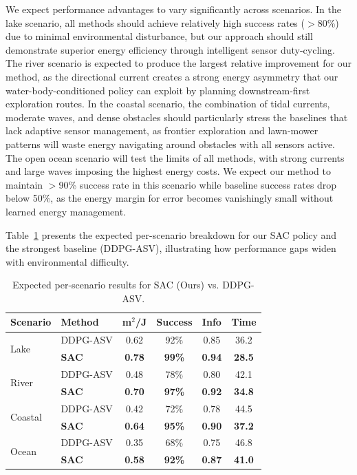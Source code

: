 \documentclass[conference]{IEEEtran}
\begin{document}
We expect performance advantages to vary significantly across scenarios. In the lake scenario, all methods should achieve relatively high success rates ($>$80\%) due to minimal environmental disturbance, but our approach should still demonstrate superior energy efficiency through intelligent sensor duty-cycling. The river scenario is expected to produce the largest relative improvement for our method, as the directional current creates a strong energy asymmetry that our water-body-conditioned policy can exploit by planning downstream-first exploration routes. In the coastal scenario, the combination of tidal currents, moderate waves, and dense obstacles should particularly stress the baselines that lack adaptive sensor management, as frontier exploration and lawn-mower patterns will waste energy navigating around obstacles with all sensors active. The open ocean scenario will test the limits of all methods, with strong currents and large waves imposing the highest energy costs. We expect our method to maintain $>$90\% success rate in this scenario while baseline success rates drop below 50\%, as the energy margin for error becomes vanishingly small without learned energy management.

Table~\ref{tab:per_scenario} presents the expected per-scenario breakdown for our SAC policy and the strongest baseline (DDPG-ASV), illustrating how performance gaps widen with environmental difficulty.

\begin{table}[t]
\centering
\caption{Expected per-scenario results for SAC (Ours) vs. DDPG-ASV.}
\label{tab:per_scenario}
\scriptsize
\begin{tabular}{llcccc}
\toprule
\textbf{Scenario} & \textbf{Method} & \textbf{m$^2$/J} & \textbf{Success} & \textbf{Info} & \textbf{Time} \\
\midrule
\multirow{2}{*}{Lake} & DDPG-ASV & 0.62 & 92\% & 0.85 & 36.2 \\
 & \textbf{SAC} & \textbf{0.78} & \textbf{99\%} & \textbf{0.94} & \textbf{28.5} \\
\midrule
\multirow{2}{*}{River} & DDPG-ASV & 0.48 & 78\% & 0.80 & 42.1 \\
 & \textbf{SAC} & \textbf{0.70} & \textbf{97\%} & \textbf{0.92} & \textbf{34.8} \\
\midrule
\multirow{2}{*}{Coastal} & DDPG-ASV & 0.42 & 72\% & 0.78 & 44.5 \\
 & \textbf{SAC} & \textbf{0.64} & \textbf{95\%} & \textbf{0.90} & \textbf{37.2} \\
\midrule
\multirow{2}{*}{Ocean} & DDPG-ASV & 0.35 & 68\% & 0.75 & 46.8 \\
 & \textbf{SAC} & \textbf{0.58} & \textbf{92\%} & \textbf{0.87} & \textbf{41.0} \\
\bottomrule
\end{tabular}
\end{table}
\end{document}
